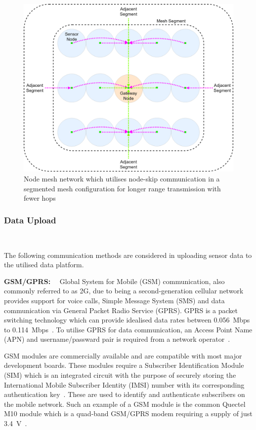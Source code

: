 \documentclass[10pt,twocolumn]{witseiepaper}
\begin{document}
			\begin{figure}
				\centering
				\includegraphics[width=1\columnwidth]{media/segment-mesh.png}
				\vspace{1em}
				\caption{Node mesh network which utilises node-skip communication in a segmented mesh configuration for longer range transmission with fewer hops}
				\raggedright
				\label{fig:segment}
			\end{figure}
	
		\subsubsection{Data Upload} $   $ \label{sec:data_upload}
		
			The following communication methods are considered in uploading sensor data to the utilised data platform.
			
				\textbf{GSM/GPRS:}~~
				Global System for Mobile (GSM) communication, also commonly referred to as 2G, due to being a second-generation cellular network provides support for voice calls, Simple Message System (SMS) and data communication via General Packet Radio Service (GPRS). GPRS is a packet switching technology which can provide idealised data rates between 0.056~Mbps to 0.114~Mbps~\cite{gprs}. To utilise GPRS for data communication, an Access Point Name (APN) and username/passward pair is required from a network operator~\cite{gprs}.
				
				GSM modules are commercially available and are compatible with most major development boards. These modules require a Subscriber Identification Module (SIM) which is an integrated circuit with the purpose of securely storing the International Mobile Subscriber Identity (IMSI) number with its corresponding authentication key~\cite{imsi}. These are used to identify and authenticate subscribers on the mobile network. Such an example of a GSM module is the common Quectel M10 module which is a quad-band GSM/GPRS modem requiring a supply of just 3.4~V~\cite{m10}.
\end{document}
